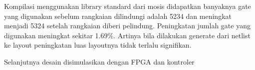Kompilasi menggunakan library standard dari mosis didapatkan banyaknya gate yang digunakan sebelum rangkaian dilindungi adalah 5234 dan meningkat menjadi 5324 setelah rangkaian diberi pelindung. Peningkatan jumlah gate yang digunakan meningkat sekitar 1.69\%. Artinya bila dilakukan generate dari netlist ke layout peningkatan luas layoutnya tidak terlalu signifikan.

Selanjutnya desain disimulasikan dengan FPGA dan kontroler